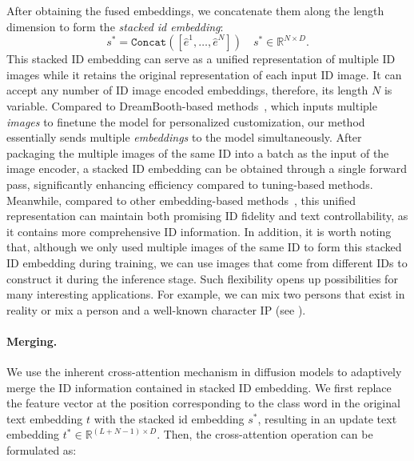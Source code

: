 After obtaining the fused embeddings, we concatenate them along the length dimension to form the \textit{stacked id embedding}:
\begin{equation}
    s^{*} = \mathtt{Concat}([\hat{e}^{1}, \dots, \hat{e}^{N}]) \quad s^{*} \in \mathbb{R}^{N\times D}.
\label{eq:stacked_embedding}
\end{equation}
This stacked ID embedding can serve as a unified representation of multiple ID images while it retains the original representation of each input ID image.
It can accept any number of ID image encoded embeddings, therefore, its length $N$ is variable. 
Compared to DreamBooth-based methods~\cite{ruiz2022dreambooth,db_lora}, which inputs multiple \textit{images} to finetune the model for personalized customization, our method essentially sends multiple \textit{embeddings} to the model simultaneously. 
After packaging the multiple images of the same ID into a batch as the input of the image encoder, a stacked ID embedding can be obtained through a single forward pass, significantly enhancing efficiency compared to tuning-based methods.
Meanwhile, compared to other embedding-based methods~\cite{wei2023elite, xiao2023fastcomposer}, this unified representation can maintain both promising ID fidelity and text controllability, as it contains more comprehensive ID information.
In addition, it is worth noting that, although we only used multiple images of the same ID to form this stacked ID embedding during training, we can use images that come from different IDs to construct it during the inference stage.
Such flexibility opens up possibilities for many interesting applications.
For example, we can mix two persons that exist in reality or mix a person and a well-known character IP (see ).

\paragraph{Merging.}
We use the inherent cross-attention mechanism in diffusion models to adaptively merge the ID information contained in stacked ID embedding.
We first replace the feature vector at the position corresponding to the class word in the original text embedding $t$ with the stacked id embedding $s^{*}$, resulting in an update text embedding $t^{*} \in \mathbb{R}^{(L+N-1)\times D}$.
Then, the cross-attention operation can be formulated as:

